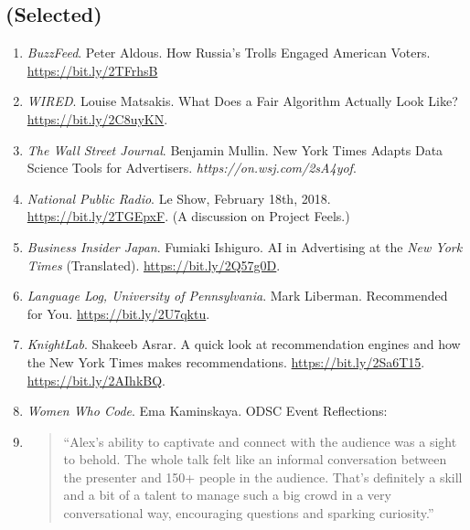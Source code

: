 \documentclass[margin]{res}
\begin{document}
\begin{resume}
\section{(Selected)}
\begin{enumerate}
	\item \textit{BuzzFeed}. Peter Aldous. How Russia's Trolls Engaged American Voters. \url{https://bit.ly/2TFrhsB}
	\item \textit{WIRED}. Louise Matsakis. What Does a Fair Algorithm Actually Look Like? \url{https://bit.ly/2C8uyKN}.
	\item \textit{The Wall Street Journal}. Benjamin Mullin. New York Times Adapts Data Science Tools for Advertisers.  \textit{https://on.wsj.com/2sA4yof}.
	\item \textit{National Public Radio}. Le Show, February 18th, 2018. \url{https://bit.ly/2TGEpxF}. (A discussion on Project Feels.)
	\item \textit{Business Insider Japan}. Fumiaki Ishiguro. AI in Advertising at the \textit{New York Times} (Translated). \url{https://bit.ly/2Q57g0D}.
	\item \textit{Language Log, University of Pennsylvania}. Mark Liberman. Recommended for You. \url{https://bit.ly/2U7qktu}.
	\item \textit{KnightLab}. Shakeeb Asrar. A quick look at recommendation engines and how the New York Times makes recommendations. \url{https://bit.ly/2Sa6T15}.
	\url{https://bit.ly/2AIhkBQ}.
	\item \textit{Women Who Code}. Ema Kaminskaya. ODSC Event Reflections:
	\item[] \begin{quote}
			``Alex’s ability to captivate and connect with the audience was a sight to behold. The whole talk felt like an informal conversation between the presenter and 150+ people in the audience. That’s definitely a skill and a bit of a talent to manage such a big crowd in a very conversational way, encouraging questions and sparking curiosity.''%
		\end{quote}
\end{enumerate}

\end{resume}
\end{document}
